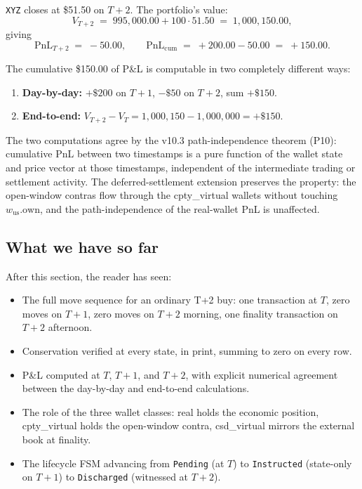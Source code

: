 \documentclass[11pt,a4paper]{article}
\begin{document}
\texttt{XYZ} closes at \$51.50 on $T+2$. The portfolio's value:
\[
V_{T+2} \;=\; 995{,}000.00 + 100 \cdot 51.50 \;=\; 1{,}000{,}150.00,
\]
giving
\[
\mathrm{PnL}_{T+2} \;=\; -50.00, \qquad \mathrm{PnL}_{\mathrm{cum}} \;=\; +200.00 - 50.00 \;=\; +150.00.
\]

The cumulative \$150.00 of P\&L is computable in two completely different ways:
\begin{enumerate}[nosep]
\item \textbf{Day-by-day:} $+\$200$ on $T+1$, $-\$50$ on $T+2$, sum $+\$150$.
\item \textbf{End-to-end:} $V_{T+2} - V_T = 1{,}000{,}150 - 1{,}000{,}000 = +\$150$.
\end{enumerate}
The two computations agree by the v10.3 path-independence theorem (P10): cumulative PnL between two timestamps is a pure function of the wallet state and price vector at those timestamps, independent of the intermediate trading or settlement activity. The deferred-settlement extension preserves the property: the open-window contras flow through the cpty\_virtual wallets without touching $w_{\mathrm{us}}.\mathrm{own}$, and the path-independence of the real-wallet PnL is unaffected.

\subsection{What we have so far}

After this section, the reader has seen:
\begin{itemize}[nosep]
\item The full move sequence for an ordinary T+2 buy: one transaction at $T$, zero moves on $T+1$, zero moves on $T+2$ morning, one finality transaction on $T+2$ afternoon.
\item Conservation verified at every state, in print, summing to zero on every row.
\item P\&L computed at $T$, $T+1$, and $T+2$, with explicit numerical agreement between the day-by-day and end-to-end calculations.
\item The role of the three wallet classes: real holds the economic position, cpty\_virtual holds the open-window contra, csd\_virtual mirrors the external book at finality.
\item The lifecycle FSM advancing from \texttt{Pending} (at $T$) to \texttt{Instructed} (state-only on $T+1$) to \texttt{Discharged} (witnessed at $T+2$).
\end{itemize}
\end{document}
